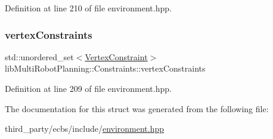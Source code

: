 Definition at line 210 of file environment.\+hpp.

\mbox{\label{structlib_multi_robot_planning_1_1_constraints_a1eeb8ac7de1947d7cbde33d24d2afefe}} 
\subsubsection{\texorpdfstring{vertex\+Constraints}{vertexConstraints}}
{\footnotesize\ttfamily std\+::unordered\+\_\+set$<$\hyperlink{structlib_multi_robot_planning_1_1_vertex_constraint}{Vertex\+Constraint}$>$ lib\+Multi\+Robot\+Planning\+::\+Constraints\+::vertex\+Constraints}



Definition at line 209 of file environment.\+hpp.



The documentation for this struct was generated from the following file\+:\begin{DoxyCompactItemize}
\item 
third\+\_\+party/ecbs/include/\hyperlink{environment_8hpp}{environment.\+hpp}\end{DoxyCompactItemize}
